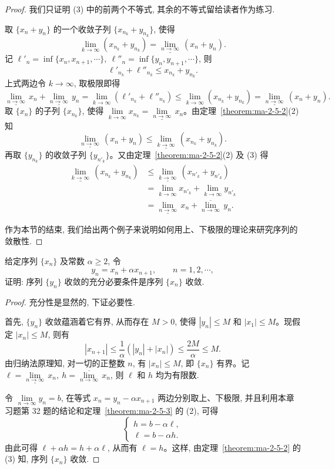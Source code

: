 \begin{proof}
我们只证明 (3) 中的前两个不等式, 其余的不等式留给读者作为练习.

取 $\{x_n+y_n\}$ 的一个收敛子列 $\{x_{n_k}+y_{n_k}\}$, 使得
\[
  \lim_{k\to\infty}(x_{n_k}+y_{n_k})
  =
  \underline{\lim_{n\to\infty}}\,(x_n+y_n).
\]
记 $\ell'_n=\inf\{x_n,x_{n+1},\cdots\},\ \ell''_n=\inf\{y_n,y_{n+1},\cdots\}$, 则
\[
  \ell'_{n_k}+\ell''_{n_k}\leqslant x_{n_k}+y_{n_k}.
\]
上式两边令 $k\to\infty$, 取极限即得
\[
  \underline{\lim_{n\to\infty}}\,x_n
  +
  \underline{\lim_{n\to\infty}}\,y_n
  =
  \lim_{k\to\infty}(\ell'_{n_k}+\ell''_{n_k})
  \leqslant
  \lim_{k\to\infty}(x_{n_k}+y_{n_k})
  =
  \underline{\lim_{n\to\infty}}\,(x_n+y_n).
\]
取 $\{x_n\}$ 的子列 $\{x_{n_k}\}$, 使得 $\lim\limits_{k\to\infty}x_{n_k}=\underline{\lim\limits_{n\to\infty}}\,x_n$。由定理~\ref{theorem:ma-2-5-2}(2) 知
\[
  \underline{\lim_{n\to\infty}}\,(x_n+y_n)
  \leqslant
  \underline{\lim_{k\to\infty}}\,(x_{n_k}+y_{n_k}).
\]
再取 $\{y_{n_k}\}$ 的收敛子列 $\{y_{n'_k}\}$。又由定理~\ref{theorem:ma-2-5-2}(2) 及 (3) 得
\[
\begin{aligned}
  \underline{\lim_{k\to\infty}}\,(x_{n_k}+y_{n_k})
  &\leqslant
  \underline{\lim_{k\to\infty}}\,(x_{n'_k}+y_{n'_k})\\
  &=
  \lim_{k\to\infty}x_{n'_k}+\lim_{k\to\infty}y_{n'_k}\\
  &=
  \underline{\lim_{n\to\infty}}\,x_n
  +
  \overline{\lim_{n\to\infty}}\,y_n.
\end{aligned}
\]

作为本节的结束, 我们给出两个例子来说明如何用上、下极限的理论来研究序列的敛散性.
\end{proof}


\begin{example}\label{example:ma-2-5-3}
给定序列 $\{x_n\}$ 及常数 $\alpha\geqslant2$, 令
\[
  y_n=x_n+\alpha x_{n+1},\qquad n=1,2,\cdots,
\]
证明: 序列 $\{y_n\}$ 收敛的充分必要条件是序列 $\{x_n\}$ 收敛.
\end{example}


\begin{proof}
充分性是显然的, 下证必要性.

首先, $\{y_n\}$ 收敛蕴涵着它有界, 从而存在 $M>0$, 使得 $|y_n|\leqslant M$ 和 $|x_1|\leqslant M$。现假定 $|x_n|\leqslant M$, 则有
\[
  |x_{n+1}|\leqslant\frac1\alpha(|y_n|+|x_n|)\leqslant\frac{2M}{\alpha}\leqslant M.
\]
由归纳法原理知, 对一切的正整数 $n$, 有 $|x_n|\leqslant M$, 即 $\{x_n\}$ 有界。记 $\ell=\underline{\lim\limits_{n\to\infty}}\,x_n,\ h=\overline{\lim\limits_{n\to\infty}}\,x_n$, 则 $\ell$ 和 $h$ 均为有限数.

令 $\lim\limits_{n\to\infty}y_n=b$, 在等式 $x_n=y_n-\alpha x_{n+1}$ 两边分别取上、下极限, 并且利用本章习题第 32 题的结论和定理~\ref{theorem:ma-2-5-3} 的 (2), 可得
\[
  \begin{cases}
    h=b-\alpha\ell,\\
    \ell=b-\alpha h.
  \end{cases}
\]
由此可得 $\ell+\alpha h=h+\alpha\ell$, 从而有 $\ell=h$。这样, 由定理~\ref{theorem:ma-2-5-2} 的 (3) 知, 序列 $\{x_n\}$ 收敛.
\end{proof}


